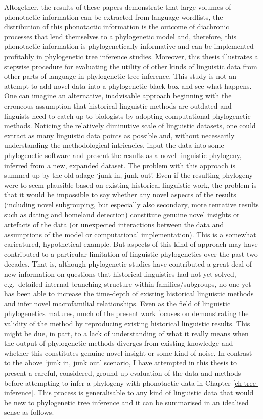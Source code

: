 Altogether, the results of these papers demonstrate that large volumes of phonotactic information can be extracted from language wordlists, the distribution of this phonotactic information is the outcome of diachronic processes that lend themselves to a phylogenetic model and, therefore, this phonotactic information is phylogenetically informative and can be implemented profitably in phylogenetic tree inference studies. Moreover, this thesis illustrates a stepwise procedure for evaluating the utility of other kinds of linguistic data from other parts of language in phylogenetic tree inference. This study is not an attempt to add novel data into a phylogenetic black box and see what happens. One can imagine an alternative, inadvisable approach beginning with the erroneous assumption that historical linguistic methods are outdated and linguists need to catch up to biologists by adopting computational phylogenetic methods. Noticing the relatively diminutive scale of linguistic datasets, one could extract as many linguistic data points as possible and, without necessarily understanding the methodological intricacies, input the data into some phylogenetic software and present the results as a novel linguistic phylogeny, inferred from a new, expanded dataset. The problem with this approach is summed up by the old adage `junk in, junk out'. Even if the resulting phylogeny were to seem plausible based on existing historical linguistic work, the problem is that it would be impossible to say whether any novel aspects of the results (including novel subgrouping, but especially also secondary, more tentative results such as dating and homeland detection) constitute genuine novel insights or artefacts of the data (or unexpected interactions between the data and assumptions of the model or computational implementation). This is a somewhat caricatured, hypothetical example. But aspects of this kind of approach may have contributed to a particular limitation of linguistic phylogenetics over the past two decades. That is, although phylogenetic studies have contributed a great deal of new information on questions that historical linguistics had not yet solved, e.g.~detailed internal branching structure within families/subgroups, no one yet has been able to increase the time-depth of existing historical linguistic methods and infer novel macrofamilial relationships. Even as the field of linguistic phylogenetics matures, much of the present work focuses on demonstrating the validity of the method by reproducing existing historical linguistic results. This might be due, in part, to a lack of understanding of what it really means when the output of phylogenetic methods diverges from existing knowledge and whether this constitutes genuine novel insight or some kind of noise. In contrast to the above `junk in, junk out' scenario, I have attempted in this thesis to present a careful, considered, ground-up evaluation of the data and methods before attempting to infer a phylogeny with phonotactic data in Chapter \ref{ch-tree-inference}. This process is generalisable to any kind of linguistic data that would be new to phylogenetic tree inference and it can be summarised in an idealised sense as follows.

